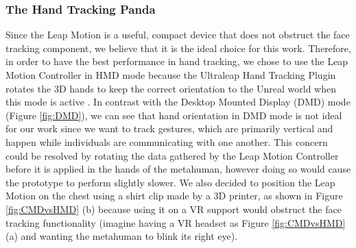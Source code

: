\subsubsection{The Hand Tracking Panda}
Since the Leap Motion is a useful, compact device that does not obstruct the face tracking component, we believe that it is the ideal choice for this work. Therefore, in order to have the best performance in hand tracking, we chose to use the Leap Motion Controller in HMD mode because the Ultraleap Hand Tracking Plugin rotates the 3D hands to keep the correct orientation to the Unreal world when this mode is active \cite{ULTP}. In contrast with the Desktop Mounted Display (DMD) mode (Figure \ref{fig:DMD}), we can see that hand orientation in DMD mode is not ideal for our work since we want to track gestures, which are primarily vertical and happen while individuals are communicating with one another. This concern could be resolved by rotating the data gathered by the Leap Motion Controller before it is applied in the hands of the metahuman, however doing so would cause the prototype to perform slightly slower. We also decided to position the Leap Motion on the chest using a shirt clip made by a 3D printer, as shown in Figure \ref{fig:CMDvsHMD} (b) because using it on a VR support would obstruct the face tracking functionality (imagine having a VR headset as Figure \ref{fig:CMDvsHMD} (a) and wanting the metahuman to blink its right eye).

